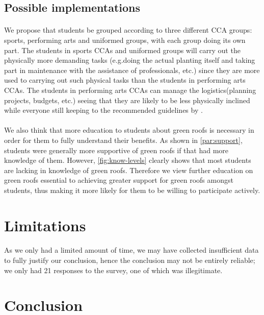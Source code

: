 \documentclass[a4paper]{article}
\begin{document}
\begin{multicols}{2}
  \subsection{Possible implementations}
  \paragraph{} We propose that students be grouped according to three
  different CCA groups: sports, performing arts and uniformed groups,
  with each group doing its own part. The students in sports CCAs
  and uniformed groups will carry out the physically more demanding
  tasks (e.g.doing the actual planting itself and taking part in
  maintenance with the assistance of professionals, etc.) since they
  are more used to carrying out such physical tasks than the students in
  performing arts CCAs. The students in performing arts CCAs can manage
  the logistics(planning projects, budgets, etc.) seeing that they are
  likely to be less physically inclined while everyone still keeping to
  the recommended guidelines by \cite{HKGreenRoofGL}.



  \paragraph{} We also think that more education to students about
  green roofs is necessary in order for them to fully understand their
  benefits. As shown in \cref{par:support}, students were generally more
  supportive of green roofs if that had more knowledge of them. However,
  \cref{fig:know-levels} clearly shows that most students are lacking in
  knowledge of green roofs. Therefore we view further education on
  green roofs essential to achieving greater support for green roofs
  amongst students, thus making it more likely for them to be willing
  to participate actively.

  \section{Limitations}
  \paragraph{} As we only had a limited amount of time, we may have collected
  insufficient data to fully justify our conclusion, hence the conclusion may
  not be entirely reliable; we only had 21 responses to the survey, one of
  which was illegitimate.
  \section{Conclusion}

\end{multicols}
\end{document}
